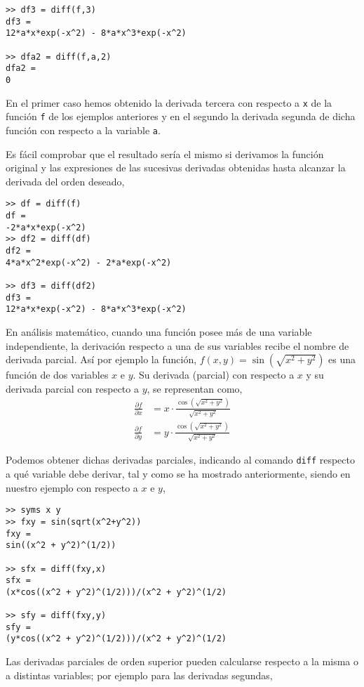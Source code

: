 \begin{verbatim}
>> df3 = diff(f,3) 
df3 = 
12*a*x*exp(-x^2) - 8*a*x^3*exp(-x^2)
 
>> dfa2 = diff(f,a,2) 
dfa2 = 
0
\end{verbatim}

En el primer caso hemos obtenido la derivada tercera con respecto a \texttt{x} de la función \texttt{f} de los ejemplos anteriores y en el segundo la derivada segunda de dicha función con respecto a la variable \texttt{a}. 

Es fácil comprobar que el resultado sería el mismo si derivamos la función original y las expresiones de las sucesivas derivadas obtenidas hasta alcanzar la derivada del orden deseado,
\begin{verbatim}
>> df = diff(f) 
df = 
-2*a*x*exp(-x^2)
>> df2 = diff(df) 
df2 = 
4*a*x^2*exp(-x^2) - 2*a*exp(-x^2)
 
>> df3 = diff(df2) 
df3 = 
12*a*x*exp(-x^2) - 8*a*x^3*exp(-x^2) 
\end{verbatim}
En análisis matemático, cuando una función posee más de una variable independiente, la derivación respecto a una de sus variables recibe el nombre de derivada parcial. Así por ejemplo la función,
$f(x,y) =\sin \left( \sqrt{x^2+y^2} \right)$ es una función de dos variables $x$ e $y$. Su derivada (parcial) con respecto a $x$ y su derivada parcial con respecto a $y$, se representan como,
\begin{align*}
\frac{\partial f}{\partial x} &= x\cdot\frac{\cos(\sqrt{x^2+y^2})}{\sqrt{x^2+y^2}} \\
\frac{\partial f}{\partial y} &= y\cdot\frac{\cos(\sqrt{x^2+y^2})}{\sqrt{x^2+y^2}}
\end{align*}

Podemos obtener dichas derivadas parciales, indicando al comando \texttt{diff} respecto a qué variable debe derivar, tal y como se ha mostrado anteriormente, siendo en nuestro ejemplo con respecto a $x$ e $y$,
\begin{verbatim}
>> syms x y
>> fxy = sin(sqrt(x^2+y^2)) 
fxy = 
sin((x^2 + y^2)^(1/2))
 
>> sfx = diff(fxy,x) 
sfx = 
(x*cos((x^2 + y^2)^(1/2)))/(x^2 + y^2)^(1/2)
 
>> sfy = diff(fxy,y) 
sfy = 
(y*cos((x^2 + y^2)^(1/2)))/(x^2 + y^2)^(1/2)
\end{verbatim} 

Las derivadas parciales de orden superior pueden calcularse respecto a la misma o a distintas variables; por ejemplo para las derivadas segundas,


